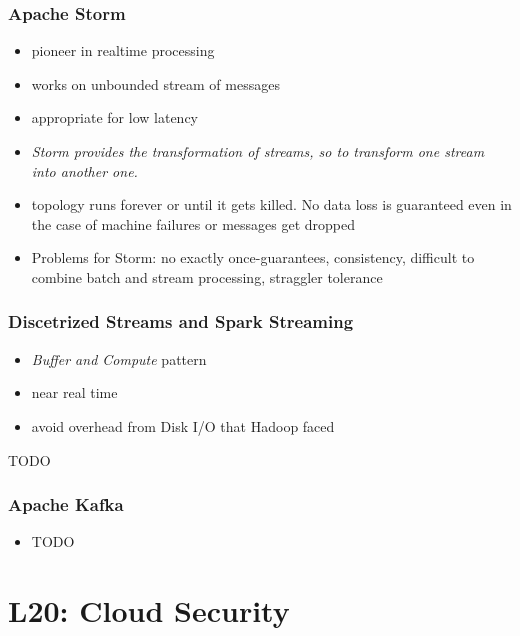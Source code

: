 \documentclass[a4paper]{article}
\begin{document}
\begin{multicols}{3}
\subsubsection{Apache Storm}
\begin{itemize}
    \item pioneer in realtime processing
    \item works on unbounded stream of messages 
    \item appropriate for low latency
    \item \textit{Storm provides the transformation of streams, so to transform one stream into another one.}
    \item topology runs forever or until it gets killed. No data loss is guaranteed even in the case of machine failures or messages get dropped
    \item Problems for Storm: no exactly once-guarantees, consistency, difficult to combine batch and stream processing, straggler tolerance
\end{itemize}

\subsubsection{Discetrized Streams and Spark Streaming}
\begin{itemize}
    \item \textit{Buffer and Compute} pattern
    \item near real time
    \item avoid overhead from Disk I/O that Hadoop faced 
\end{itemize}
TODO

\subsubsection{Apache Kafka}
\begin{itemize}
    \item TODO
\end{itemize}

\section{L20: Cloud Security}


\end{multicols}
\end{document}
